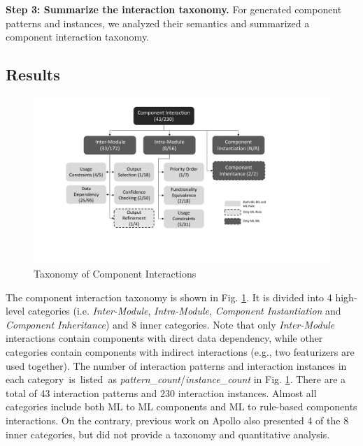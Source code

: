 \textbf{Step 3: Summarize the interaction taxonomy.} For generated component patterns and instances, we analyzed their semantics and summarized a component interaction taxonomy.

\subsection{Results}
\begin{figure}[!t]
    \centering
    \includegraphics[scale=0.38]{figs/component_interaction.pdf}
    \caption{Taxonomy of Component Interactions}
    \label{component_interaction_fig}
\end{figure}

The component interaction taxonomy is shown in Fig. \ref{component_interaction_fig}. It is divided into 4 high-level categories (i.e. \textit{Inter-Module}, \textit{Intra-Module}, \textit{Component Instantiation} and \textit{Component Inheritance}) and 8 inner categories. 
Note that only \textit{Inter-Module} interactions contain components with direct data dependency, while other categories contain components with indirect interactions (e.g., two featurizers are used together). The number of interaction patterns and interaction instances in each category~is~listed~as \textit{pattern\_count}/\textit{instance\_count} in Fig. \ref{component_interaction_fig}. There are a total of 43 interaction patterns and 230 interaction instances.
Almost all categories include both ML to ML components and ML to rule-based components interactions. On the contrary, previous work on Apollo \cite{pengFirstLookIntegration2020} also presented 4 of the 8 inner categories, but did not provide a taxonomy and quantitative analysis. 


